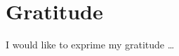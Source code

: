 
\bigskip

\begingroup
\let\clearpage\relax
\let\cleardoublepage\relax
\let\cleardoublepage\relax
\chapter*{Gratitude}

\def\thanks#1{%
\begingroup
\leftskip1em
\noindent #1
\par
\endgroup
}

I would like to exprime my gratitude \dots

\endgroup





  